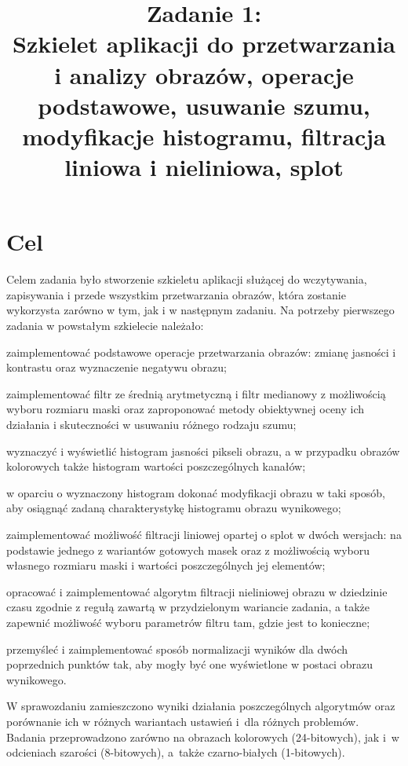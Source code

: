 \documentclass{classrep}
\author{
  \studentinfo{Paweł Musiał}{178726} \and
  \studentinfo{Łukasz Michalski}{178724}
}
\title{Zadanie 1:\\  \textbf {Szkielet aplikacji do przetwarzania \\i analizy obrazów, operacje podstawowe, usuwanie szumu, modyfikacje histogramu, filtracja liniowa i nieliniowa, splot}}
\begin{document}
\maketitle

\addtocounter{footnote}{1}

\section{Cel}

Celem zadania było stworzenie szkieletu aplikacji służącej do wczytywania, zapisywania i przede wszystkim przetwarzania obrazów, która zostanie wykorzysta zarówno w tym, jak i w następnym zadaniu. Na potrzeby pierwszego zadania w powstałym szkielecie należało:

\begin{list}{•}{}
\item zaimplementować podstawowe operacje przetwarzania obrazów: zmianę jasności i kontrastu oraz wyznaczenie negatywu obrazu;
\item zaimplementować filtr ze średnią arytmetyczną i filtr medianowy z możliwością wyboru rozmiaru maski oraz zaproponować metody obiektywnej oceny ich działania i skuteczności w usuwaniu różnego rodzaju szumu;
\item wyznaczyć i wyświetlić histogram jasności pikseli obrazu, a w przypadku
obrazów kolorowych także histogram wartości poszczególnych kanałów;
\item w oparciu o wyznaczony histogram dokonać modyfikacji obrazu w taki sposób, aby osiągnąć zadaną charakterystykę histogramu obrazu wynikowego;
\item zaimplementować możliwość filtracji liniowej opartej o splot w dwóch wersjach: na podstawie jednego z wariantów gotowych masek oraz z możliwością wyboru własnego rozmiaru maski i wartości poszczególnych jej elementów;
\item opracować i zaimplementować algorytm filtracji nieliniowej obrazu w dziedzinie czasu zgodnie z regułą zawartą w przydzielonym wariancie zadania, a także zapewnić możliwość wyboru parametrów filtru tam, gdzie jest to konieczne;
\item przemyśleć i zaimplementować sposób normalizacji wyników dla dwóch poprzednich punktów tak, aby mogły być one wyświetlone w postaci obrazu wynikowego.
\end{list}

W sprawozdaniu zamieszczono wyniki działania poszczególnych algorytmów oraz porównanie ich w różnych wariantach ustawień i~dla różnych problemów. Badania przeprowadzono zarówno na obrazach kolorowych (24-bitowych), jak i~w odcieniach szarości (8-bitowych), a~także czarno-białych (1-bitowych). 
\end{document}
